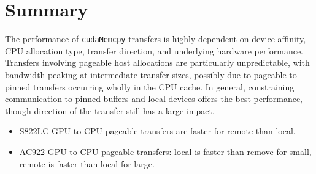 \section{Summary}

The performance of \texttt{cudaMemcpy} transfers is highly dependent on device affinity, CPU allocation type, transfer direction, and underlying hardware performance.
Transfers involving pageable host allocations are particularly unpredictable, with bandwidth peaking at intermediate transfer sizes, possibly due to pageable-to-pinned transfers occurring wholly in the CPU cache.
In general, constraining communication to pinned buffers and local devices offers the best performance, though direction of the transfer still has a large impact.

\begin{itemize}
	\item S822LC GPU to CPU pageable transfers are faster for remote than local.
	\item AC922 GPU to CPU pageable transfers: local is faster than remove for small, remote is faster than local for large.
\end{itemize}
